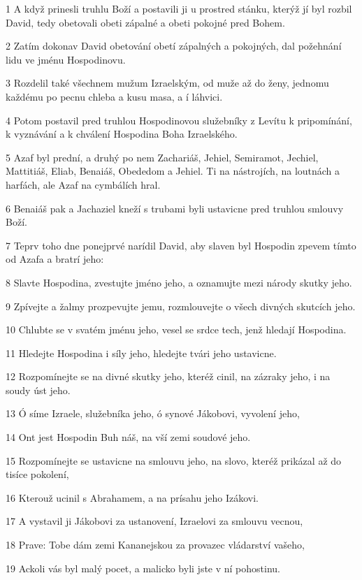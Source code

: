 \par 1 A když prinesli truhlu Boží a postavili ji u prostred stánku, kterýž jí byl rozbil David, tedy obetovali obeti zápalné a obeti pokojné pred Bohem.
\par 2 Zatím dokonav David obetování obetí zápalných a pokojných, dal požehnání lidu ve jménu Hospodinovu.
\par 3 Rozdelil také všechnem mužum Izraelským, od muže až do ženy, jednomu každému po pecnu chleba a kusu masa, a í láhvici.
\par 4 Potom postavil pred truhlou Hospodinovou služebníky z Levítu k pripomínání, k vyznávání a k chválení Hospodina Boha Izraelského.
\par 5 Azaf byl prední, a druhý po nem Zachariáš, Jehiel, Semiramot, Jechiel, Mattitiáš, Eliab, Benaiáš, Obededom a Jehiel. Ti na nástrojích, na loutnách a harfách, ale Azaf na cymbálích hral.
\par 6 Benaiáš pak a Jachaziel kneží s trubami byli ustavicne pred truhlou smlouvy Boží.
\par 7 Teprv toho dne ponejprvé narídil David, aby slaven byl Hospodin zpevem tímto od Azafa a bratrí jeho:
\par 8 Slavte Hospodina, zvestujte jméno jeho, a oznamujte mezi národy skutky jeho.
\par 9 Zpívejte a žalmy prozpevujte jemu, rozmlouvejte o všech divných skutcích jeho.
\par 10 Chlubte se v svatém jménu jeho, vesel se srdce tech, jenž hledají Hospodina.
\par 11 Hledejte Hospodina i síly jeho, hledejte tvári jeho ustavicne.
\par 12 Rozpomínejte se na divné skutky jeho, kteréž cinil, na zázraky jeho, i na soudy úst jeho.
\par 13 Ó síme Izraele, služebníka jeho, ó synové Jákobovi, vyvolení jeho,
\par 14 Ont jest Hospodin Buh náš, na vší zemi soudové jeho.
\par 15 Rozpomínejte se ustavicne na smlouvu jeho, na slovo, kteréž prikázal až do tisíce pokolení,
\par 16 Kterouž ucinil s Abrahamem, a na prísahu jeho Izákovi.
\par 17 A vystavil ji Jákobovi za ustanovení, Izraelovi za smlouvu vecnou,
\par 18 Prave: Tobe dám zemi Kananejskou za provazec vládarství vašeho,
\par 19 Ackoli vás byl malý pocet, a malicko byli jste v ní pohostinu.
